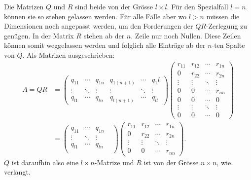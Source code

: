 Die Matrizen $Q$ und $R$ sind beide von der Grösse $l\times l$.
Für den Spezialfall $l=n$ können sie so stehen gelassen werden.
Für alle Fälle aber wo $l>n$ müssen die Dimensionen noch angepasst werden, um den Forderungen der $QR$-Zerlegung zu genügen.
In der Matrix $R$ stehen ab der $n.$ Zeile nur noch Nullen.
Diese Zeilen können somit weggelassen werden und folglich alle Einträge ab der $n$-ten Spalte von $Q$.
Als Matrizen ausgeschrieben:
\begin{align*}
A=QR
&=
\begin{pmatrix}
q_{11}&\cdots&q_{1n}&q_{1(n+1)}&\cdots&q_1l\\
\vdots&\ddots&\vdots&\vdots    &\ddots&\vdots\\
q_{l1}&\cdots&q_{ln}&q_{l(n+1)}&\cdots&q_{ll}
\end{pmatrix}
\begin{pmatrix}
r_{11}&r_{12}&\cdots&r_{1n}\\
0     &r_{22}&\cdots&r_{2n}\\
\vdots&\vdots&\ddots&\vdots\\
0     &0     &\cdots&r_{nn}\\
0     &0     &\cdots&0\\
\vdots&\vdots&\ddots&\vdots\\
0     &0     &\cdots&0
\end{pmatrix}\\
&=
\begin{pmatrix}
q_{11}&\cdots&q_{1n}&\\
\vdots&\ddots&\vdots&\\
q_{l1}&\cdots&q_{ln}\\
\end{pmatrix}
\begin{pmatrix}
r_{11}&r_{12}&\cdots&r_{1n}\\
0     &r_{22}&\cdots&r_{2n}\\
\vdots&\vdots&\ddots&\vdots\\
0     &0     &\cdots&r_{nn}
\end{pmatrix}.
\end{align*}
$Q$ ist daraufhin also eine $l\times n$-Matrize und $R$ ist von der Grösse $n\times n$, wie verlangt.

